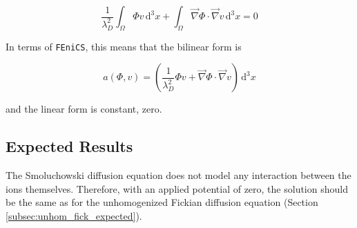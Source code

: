 \begin{equation}
\frac{1}{\lambda_D^2} \int_{\Omega} \Phi v \,\mathrm{d}^3x
+ \int_{\Omega} \vec{\nabla}\Phi \cdot \vec{\nabla}v \,\mathrm{d}^3x
= 0
\end{equation}

In terms of \texttt{FEniCS}, this means that the bilinear form is

\begin{equation}
a(\Phi,v)=\left(\frac{1}{\lambda_D^2} \Phi v  + \vec{\nabla}\Phi \cdot \vec{\nabla}v \right) \,\mathrm{d}^3x
\end{equation}

and the linear form is constant, zero.

\subsection{Expected Results}\label{subsec:unhom_smol_expected}

The Smoluchowski diffusion equation does not model any interaction between the ions themselves.
Therefore, with an applied potential of zero,
the solution should be the same as for the
unhomogenized Fickian diffusion equation (Section \ref{subsec:unhom_fick_expected}).

